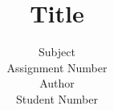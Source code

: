 \documentclass[12pt, a4paper]{article}
\title{Title\vspace{-2ex}}
\author{Subject\\Assignment Number\\Author\\Student Number}
\date{\vspace{-5ex}}
\begin{document}
\maketitle
%

\begin{spacing}{1.5}







\end{spacing}
\end{document}
